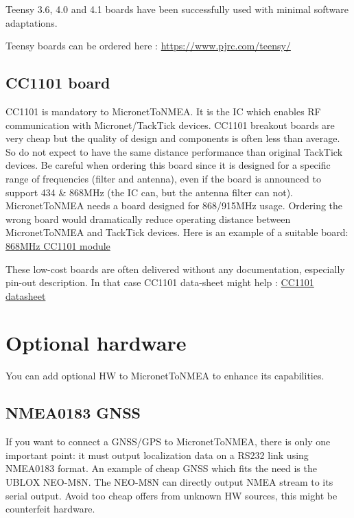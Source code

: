 \documentclass{report}
\begin{document}
Teensy 3.6, 4.0 and 4.1 boards have been successfully used with minimal software adaptations.

Teensy boards can be ordered here : \url{https://www.pjrc.com/teensy/}

\subsection{CC1101 board}

CC1101 is mandatory to MicronetToNMEA. It is the IC which enables RF communication with Micronet/TackTick devices. CC1101 breakout boards are very cheap but the quality of design and components is often less than average. So do not expect to have the same distance performance than original TackTick devices. Be careful when ordering this board since it is designed for a specific range of frequencies (filter and antenna), even if the board is announced to support 434 \& 868MHz (the IC can, but the antenna filter can not). MicronetToNMEA needs a board designed for 868/915MHz usage. Ordering the wrong board would dramatically reduce operating distance between MicronetToNMEA and TackTick devices. Here is an example of a suitable board: \href{https://www.amazon.fr/laqiya-cc1101-868-MHz-Transmission-Antenne-Transceiver/dp/B075PFQ57G}{868MHz CC1101 module}

These low-cost boards are often delivered without any documentation, especially pin-out description. In that case CC1101 data-sheet might help : \href{https://www.ti.com/lit/ds/symlink/cc1101.pdf}{CC1101 datasheet}

\section{Optional hardware}

You can add optional HW to MicronetToNMEA to enhance its capabilities.

\subsection{NMEA0183 GNSS}

If you want to connect a GNSS/GPS to MicronetToNMEA, there is only one important point: it must output localization data on a RS232 link using NMEA0183 format. An example of cheap GNSS which fits the need is the UBLOX NEO-M8N. The NEO-M8N can directly output NMEA stream to its serial output. Avoid too cheap offers from unknown HW sources, this might be counterfeit hardware.
\end{document}
